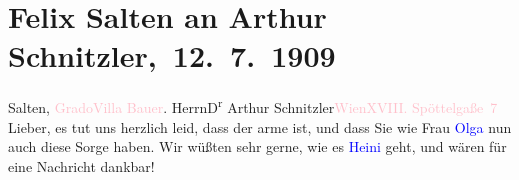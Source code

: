 

\renewcommand{\erwaehntePersonen}{Personen:  ?? [Mediziner in Grado], Anna Katharina Rehmann, Felix Salten, Heinrich Schnitzler, Olga Schnitzler}
\renewcommand{\erwaehnteOrte}{Orte: Edmund-Weiß-Gasse 7, Grado, Höhlenstein, Villa Bauer, Wien}
\renewcommand{\erwaehnteWerke}{}
\section[ Felix Salten an Arthur Schnitzler, 12. 7. 1909]{Felix Salten an Arthur Schnitzler, 12. 7. 1909}
\nopagebreak{}
\rehead{ }\normalsize\beginnumbering{}
\toendnotes[C]{\smallbreak\pagebreak[2]}
\toendnotes[C]{\smallbreak}\pstart{}{\pb}Salten, \textcolor{pink}{Grado}{}\ledrightnote{\textcolor{pink}{Grado}}\pend{}\pstart{}\textcolor{pink}{Villa Bauer}{}\ledrightnote{\textcolor{pink}{Villa Bauer}}.\pend{}
{\bigskip}\pstart{}Herrn\pend{}\pstart{}D\textsuperscript{r} Arthur Schnitzler\pend{}\pstart{}\textcolor{pink}{Wien}{}\ledrightnote{\textcolor{pink}{Wien}}\pend{}\pstart{}\textcolor{pink}{XVIII. Spöttelgaße 7}{}\ledrightnote{\textcolor{pink}{Edmund-Weiß-Gasse 7}}\pend{}
{\bigskip}
\pstart{}{\pb}Lieber,\pend
\pstart
           es tut uns herzlich leid, dass der arme \label{K_L03502-1v}\label{K_L03502-1h} ist, und dass Sie wie Frau \textcolor{blue}{Olga}{}\ledrightnote{\textcolor{blue}{Olga Schnitzler}} nun
               auch diese Sorge haben. Wir wüßten sehr gerne, wie es \textcolor{blue}{Heini}{}\ledrightnote{\textcolor{blue}{Heinrich Schnitzler}} geht, und wären für eine Nachricht dankbar!\pend
           
